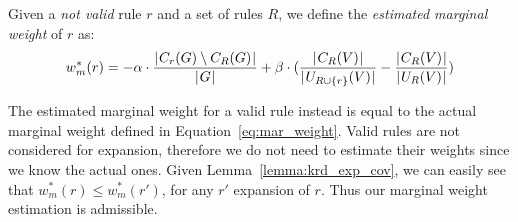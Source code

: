 \begin{definition}\label{def:est_res_wei}
	Given a \emph{not valid} rule $r$ and a set of rules $R$, we define the \emph{estimated marginal weight} of $r$ as:
	\begin{equation*}
	w_m^*(r) = - \alpha \cdot \frac{\mid \hspace{-0.5ex} C_{r}(G) \setminus C_{R}(G) \hspace{-0.5ex} \mid}{\mid \hspace{-0.5ex} G \hspace{-0.5ex} \mid} + \beta \cdot (\frac{\mid \hspace{-0.5ex} C_R(V) \hspace{-0.5ex} \mid}{\mid \hspace{-0.5ex} U_{R \cup \{r\}}(V) \hspace{-0.5ex} \mid} - \frac{\mid \hspace{-0.5ex} C_{R}(V) \hspace{-0.5ex} \mid}{\mid \hspace{-0.5ex} U_{R}(V) \hspace{-0.5ex} \mid})
	\end{equation*}
\end{definition}

The estimated marginal weight for a valid rule instead is equal to the actual marginal weight defined in Equation~\ref{eq:mar_weight}. Valid rules are not considered for expansion, therefore we do not need to estimate their weights since we know the actual ones. Given Lemma~\ref{lemma:krd_exp_cov}, we can easily see that $w_m^*(r) \leq w_m^*(r')$, for any $r'$ expansion of $r$. Thus our marginal weight estimation is admissible. 



\setlength{\textfloatsep}{0pt}%

\setlength{\textfloatsep}{5pt}


